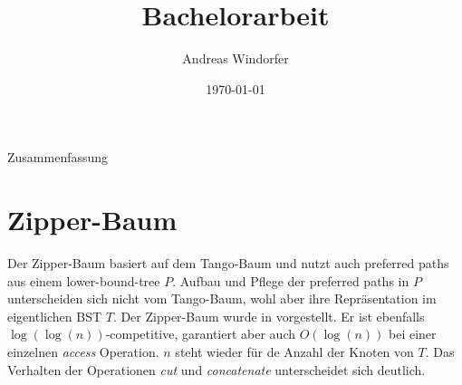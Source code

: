 \documentclass[a4paper,12pt]{article}
\title{Bachelorarbeit}
\author{
Andreas Windorfer\\
}
\date{\today}
\begin{document}
\maketitle
\newpage
Zusammenfassung
\newpage
\tableofcontents


\newpage


\section {Zipper-Baum}
Der Zipper-Baum basiert auf dem Tango-Baum und nutzt auch preferred paths aus einem lower-bound-tree $P$. Aufbau und Pflege der preferred paths in $P$ unterscheiden sich nicht vom Tango-Baum, wohl aber ihre Repräsentation im eigentlichen BST $T$. Der Zipper-Baum wurde in \cite{zipper} vorgestellt. Er ist ebenfalls $\log\left(\log\left(n\right)\right)$-competitive,  garantiert aber auch  $O\left(\log \left(n\right)\right)$ bei einer einzelnen \textit{access} Operation. $n$ steht wieder für de Anzahl der Knoten von $T$.  Das Verhalten der Operationen \textit{cut} und \textit{concatenate} unterscheidet sich deutlich. 
\end{document}
